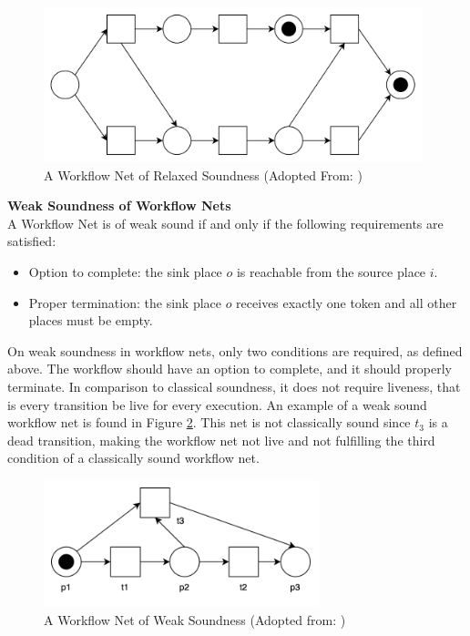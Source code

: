 \begin{figure}[H]
    \centering
    \includegraphics[width=11cm]{../figures/RelaxedSoundWFNet.png}
    \caption{A Workflow Net of Relaxed Soundness (Adopted From: \cite{Aalst2011})}
    \label{WNRelaxed}
\end{figure}
\begin{defn}\textbf{Weak Soundness of Workflow Nets} \cite{Malinao2017}\\
    \label{WeakWNDef}
    A Workflow Net is of weak sound if and only if the following requirements are satisfied:
    \begin{itemize}
        \item Option to complete: the sink place $ o $ is reachable from the source place $ i $.
        \item Proper termination: the sink place $ o $ receives exactly one token and all other places must be empty.
    \end{itemize}
\end{defn}
On weak soundness in workflow nets, only two conditions are required, as defined above. The workflow should have an option to complete, and it should properly terminate. In comparison to classical soundness, it does not require liveness, that is every transition be live for every execution. An example of a weak sound workflow net is found in Figure \ref{WeakSoundWFNet}. This net is not classically sound since $t_3$ is a dead transition, making the workflow net not live and not fulfilling the third condition of a classically sound workflow net. 

\begin{figure}[H]
    \centering
    \includegraphics[width=8cm]{../figures/WeakSoundWFNet.png}
    \caption{A Workflow Net of Weak Soundness (Adopted from: \cite{Aalst2011})}
    \label{WeakSoundWFNet}
\end{figure}

